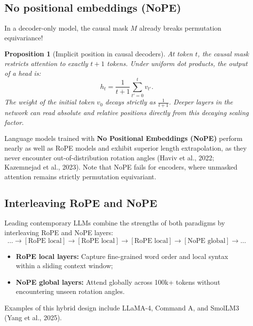 \documentclass[11pt,a4paper]{article}
\newcommand{\slides}[1]{\par\nopagebreak\noindent{\normalfont\small\emph{(slides #1)}}\par\nopagebreak\vspace{2pt}}
\theoremstyle{definition}
\theoremstyle{plain}
\newtheorem{proposition}[definition]{Proposition}
\begin{document}
\subsection{No positional embeddings (NoPE)}\slides{58 / 84}
In a decoder-only model, the causal mask $M$ already breaks permutation equivariance!
\begin{proposition}[Implicit position in causal decoders]
At token $t$, the causal mask restricts attention to exactly $t+1$ tokens. Under uniform dot products, the output of a head is:
\begin{equation}
h_t = \frac{1}{t+1} \sum_{t'=0}^t v_{t'}.
\end{equation}
The weight of the initial token $v_0$ decays strictly as $\frac{1}{t+1}$. Deeper layers in the network can read absolute and relative positions directly from this decaying scaling factor.
\end{proposition}
Language models trained with \textbf{No Positional Embeddings (NoPE)} perform nearly as well as RoPE models and exhibit superior length extrapolation, as they never encounter out-of-distribution rotation angles (Haviv et al., 2022; Kazemnejad et al., 2023). Note that NoPE fails for encoders, where unmasked attention remains strictly permutation equivariant.

\subsection{Interleaving RoPE and NoPE}\slides{59 / 84}
Leading contemporary LLMs combine the strengths of both paradigms by interleaving RoPE and NoPE layers:
\begin{equation}
\dots \longrightarrow [\text{RoPE local}] \longrightarrow [\text{RoPE local}] \longrightarrow [\text{RoPE local}] \longrightarrow [\text{NoPE global}] \longrightarrow \dots
\end{equation}
\begin{itemize}[nosep]
\item \textbf{RoPE local layers:} Capture fine-grained word order and local syntax within a sliding context window;
\item \textbf{NoPE global layers:} Attend globally across 100k+ tokens without encountering unseen rotation angles.
\end{itemize}
Examples of this hybrid design include LLaMA-4, Command A, and SmolLM3 (Yang et al., 2025).
\end{document}
